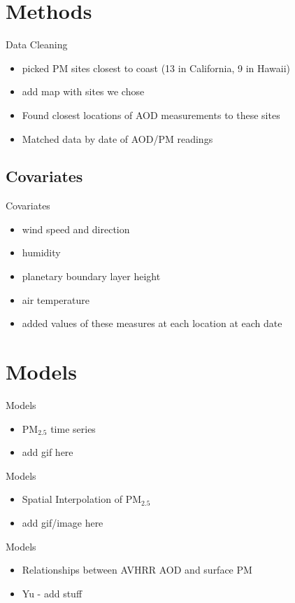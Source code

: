 \documentclass[notheorems,envcountsect,allowframebreaks,xcolor=svgnames,8pt]{beamer}
\begin{document}
\section*{Methods}
\begin{frame}{Data Cleaning}
\begin{itemize}
\item picked PM sites closest to coast (13 in California, 9 in Hawaii)
\item add map with sites we chose
\item Found closest locations of AOD measurements to these sites
\item Matched data by date of AOD/PM readings

\end{itemize}
\end{frame}
\subsection*{Covariates}
\begin{frame}{Covariates}
\begin{itemize}	
\item wind speed and direction
\item humidity
\item planetary boundary layer height
\item air temperature
\item added values of these measures at each location at each date
\end{itemize}
\end{frame}
\section*{Models}
\begin{frame}{Models}
\begin{itemize}	
\item PM$_{2.5}$ time series
\item add gif here
\end{itemize}
\end{frame}
\begin{frame}{Models}
\begin{itemize}	
\item Spatial Interpolation of PM$_{2.5}$
\item add gif/image here
\end{itemize}
\end{frame}
\begin{frame}{Models}
\begin{itemize}	
\item Relationships between AVHRR AOD and surface PM
\item Yu - add stuff
\end{itemize}
\end{frame}
\end{document}
